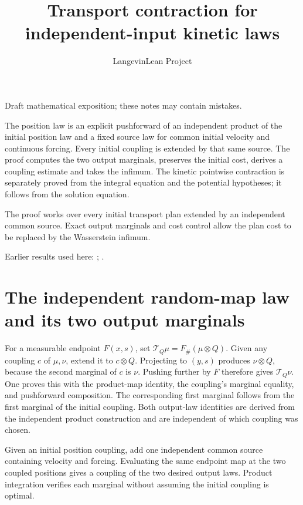 \documentclass[11pt,a4paper]{article}
\title{\texorpdfstring{Transport contraction for independent-input kinetic laws}{Transport contraction for independent-input kinetic laws}}
\author{LangevinLean Project}
\date{}
\begin{document}
\maketitle
Draft mathematical exposition; these notes may contain mistakes.


The position law is an explicit pushforward of an independent product of the initial position law and a fixed source law for common initial velocity and continuous forcing. Every initial coupling is extended by that same source. The proof computes the two output marginals, preserves the initial cost, derives a coupling estimate and takes the infimum. The kinetic pointwise contraction is separately proved from the integral equation and the potential hypotheses; it follows from the solution equation.



The proof works over every initial transport plan extended by an independent common source. Exact output marginals and cost control allow the plan cost to be replaced by the Wasserstein infimum.



Earlier results used here: \cite[Section~3.22]{LangevinLean2026ULASC}; \cite[Section~3.18]{LangevinLean2026ULASC}.

\section{\texorpdfstring{The independent random-map law and its two output marginals}{The independent random-map law and its two output marginals}}


For a measurable endpoint \(F(x,s)\), set \(\mathcal T_Q\mu=F_\#(\mu\otimes Q)\). Given any coupling \(c\) of \(\mu,\nu\), extend it to \(c\otimes Q\). Projecting to \((y,s)\) produces \(\nu\otimes Q\), because the second marginal of \(c\) is \(\nu\). Pushing further by \(F\) therefore gives \(\mathcal T_Q\nu\). One proves this with the product-map identity, the coupling's marginal equality, and pushforward composition. The corresponding first marginal follows from the first marginal of the initial coupling. Both output-law identities are derived from the independent product construction and are independent of which coupling was chosen.



Given an initial position coupling, add one independent common source containing velocity and forcing. Evaluating the same endpoint map at the two coupled positions gives a coupling of the two desired output laws. Product integration verifies each marginal without assuming the initial coupling is optimal.
\end{document}
